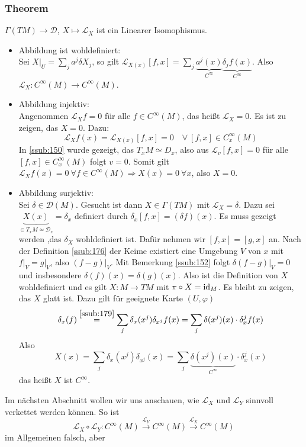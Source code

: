 \subsubsection{Theorem}
\label{ssub:153}
$\Gamma(TM) \to \mathcal{D}$, $X \mapsto \mathcal{L}_X$ ist ein Linearer Isomophismus.
\begin{itemize}
\item Abbildung ist wohldefiniert:\\
Sei $X\vert_U = \sum_j a^j \delta X_j$, so gilt $\mathcal{L}_{X(x)}[f,x] = \sum_j \underbrace{a^j(x)}_{C^\infty} \underbrace{\delta_j f(x)}_{C^\infty}$. Also $\mathcal{L}_X: C^\infty(M) \to C^\infty(M)$.
\item Abbildung injektiv:\\
Angenommen $\mathcal{L}_X f = 0$ für alle $f\in C^\infty(M)$, das heißt $\mathcal{L}_X = 0$. Es ist zu zeigen, das $X = 0$. Dazu:
\[
\mathcal{L}_X f(x) = \mathcal{L}_{X(x)} [f,x] = 0\quad \forall\ [f,x]\in C^\infty_x (M)
\]
In \ref{ssub:150} wurde gezeigt, das $T_x M \simeq D_x$, also aus $\mathcal{L}_v [f,x] = 0$ für alle $[f,x]\in C^\infty_x (M)$ folgt $v = 0$. Somit gilt $\mathcal{L}_X f(x) = 0\ \forall f\in C^\infty (M)\Rightarrow X(x) = 0\ \forall x$, also $X = 0$. 
\item Abbildung surjektiv:\\
Sei $\delta \in \mathcal{D}(M)$. Gesucht ist dann $X\in \Gamma(TM)$ mit $\mathcal{L}_X = \delta$. Dazu sei $\underbrace{X(x)}_{\in T_x M \simeq \mathcal{D}_x} = \delta_x$ definiert durch $\delta_x [f,x] = (\delta f)(x)$. Es muss gezeigt werden ,das $\delta_X$ wohldefiniert ist. Dafür nehmen wir $[f,x] = [g,x]$ an. Nach der Definition \ref{ssub:176} der Keime existiert eine Umgebung $V$ von $x$ mit $f\vert_V = g\vert_V$, also $(f-g)\vert_V$. Mit Bemerkung \ref{ssub:152} folgt $\delta(f-g)\vert_V = 0$ und insbesondere $\delta(f)(x) = \delta(g)(x)$. Also ist die Definition von $X$ wohldefiniert und es gilt $X: M \to TM$ mit $\pi \circ X = \operatorname{id}_M$. Es bleibt zu zeigen, das $X$ glatt ist. Dazu gilt für geeignete Karte $(U,\varphi)$ 
\[
\delta_x(f) \overset{\ref{ssub:179}}{=} \sum_j \delta_x (x^j) \delta_{x^j} f(x) = \sum_j \delta(x^j)(x)\cdot \delta_x^j f(x) 
\]
Also
\[
X(x) = \sum_j \delta_x (x^j) \delta_{x^j} (x) = \sum_j \underbrace{\delta(x^j)(x)}_{C^\infty}\cdot \delta_x^j (x)
\]
das heißt $X$ ist $C^\infty$.
\end{itemize}
Im nächsten Abschnitt wollen wir uns anschauen, wie $\mathcal{L}_X$ und $\mathcal{L}_Y$ sinnvoll verkettet werden können. So ist 
\[
\mathcal{L}_X \circ \mathcal{L}_Y: C^\infty (M) \xrightarrow{\mathcal{L}_Y} C^\infty (M) \xrightarrow{\mathcal{L}_X} C^\infty (M)
\]
im Allgemeinen falsch, aber

